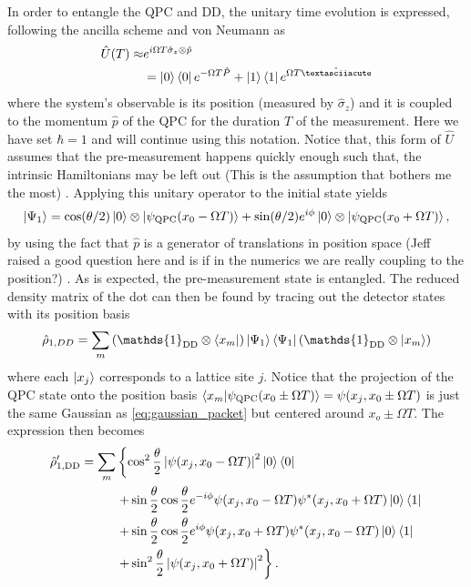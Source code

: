 \documentclass{article}
\newcommand{\Id}{\mathds{1}}
\newcommand\sj[1]{ {\color{orange} #1} }
\begin{document}
In order to entangle the QPC and DD, the unitary time evolution is expressed, following the 
ancilla scheme and von Neumann as
\begin{align}
    \hat{U}(T) \approx & e^{i\Omega T \hat{\sigma}_z \otimes \hat{p}} \\
            & = \ket{0}\bra{0} e^{-\Omega T \hat{P}} + \ket{1}\bra{1} e^{\Omega T \hat{´}}
\end{align}
where the system's observable is its position (measured by $\hat{\sigma}_z$) and it is coupled to the momentum 
$\hat{p}$ of the QPC for the duration $T$ of the measurement. 
Here we have set $\hbar=1$ and will continue using this notation. Notice that, this form of $\hat{U}$ assumes that
the pre-measurement happens quickly enough such that, the intrinsic Hamiltonians may be left out \sj{(This is 
the assumption that bothers me the most)}.
Applying this unitary operator to the initial state yields
\begin{eqnarray}
    \ket{\Psi_1} = \cos(\theta/2) \ket{0}\otimes \ket{\psi_{\rm QPC}(x_0-\Omega T)} + 
                    \sin(\theta/2) e^{i\phi}\ket{0}\otimes \ket{\psi_{\rm QPC}(x_0+\Omega T)}, 
\end{eqnarray}
by using the fact that $\hat{p}$ is a generator of translations in position space \cite{vonNeumannFoundationsQuantum2018} \sj{(Jeff raised a good question here and is if
in the numerics we are really coupling to the position?)}. 
As is expected, the pre-measurement state is entangled. The reduced
density matrix of the dot can then be found by tracing out the detector states with its position basis
\begin{align*}
    \hat{\rho}_{1,DD} = \sum_{m} \left(\Id_{\rm DD}\otimes \bra{x_m}\right)  \ket{\Psi_1} \bra{\Psi_1}
    \left(\Id_{\rm DD}\otimes \ket{x_m}\right)
\end{align*}
where each $\ket{x_j}$ corresponds to a lattice site $j$. Notice that the projection of the QPC state onto 
the position basis $\bra{x_m}\ket{\psi_{\rm QPC}(x_0\pm\Omega T)} = \psi(x_j, x_0\pm\Omega T)$ is just the same 
Gaussian as \eqref{eq:gaussian_packet} but centered around $x_o \pm \Omega T$. The expression then becomes
\begin{align*}
        \hat{\rho}_{1,\rm DD}^{\prime}=  \sum_m & \left\{\cos^2 \frac{\theta}{2}\left| \psi(x_j, x_0-\Omega T)\right|^2\ket{0} 
        \bra{0} \right. \\
        &\left.+\sin\frac{\theta}{2} \cos\frac{\theta}{2} e^{-i \phi} \psi(x_j, x_0-\Omega T)
        \psi^*(x_j, x_0 + \Omega T) \ket{0}\bra{1}  \right.\\
        &\left.+\sin\frac{\theta}{2} \cos\frac{\theta}{2} e^{i \phi} \psi(x_j, x_0+\Omega T)
        \psi^*(x_j, x_0 - \Omega T) \ket{0}\bra{1}  \right.\\
        & \left. +\sin^2 \frac{\theta}{2}\left| \psi(x_j, x_0+\Omega T) \right|^2 \right\}.
\end{align*}
\end{document}
